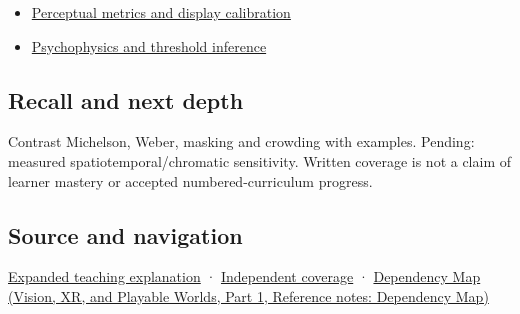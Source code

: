\begin{itemize}
\tightlist
\item
  \hyperref[appendix-b2c1846508bf]{Perceptual metrics and display calibration}
\item
  \hyperref[appendix-1759f03e8ce7]{Psychophysics and threshold inference}
\end{itemize}

\subsection{Recall and next depth}\label{appendix-b3aa9e8e01ad-recall-and-next-depth}

\hypertarget{appendix-b3aa9e8e01ad-recall-and-next-depth}{}

Contrast Michelson, Weber, masking and crowding with examples. Pending: measured spatiotemporal/chromatic sensitivity. Written coverage is not a claim of learner mastery or accepted numbered-curriculum progress.

\subsection{Source and navigation}\label{appendix-b3aa9e8e01ad-source-and-navigation}

\hypertarget{appendix-b3aa9e8e01ad-source-and-navigation}{}

\hyperref[04-visual-computing-ii-ch042-visibility-is-about-contrast-conditions-and-tasks]{Expanded teaching explanation} · \hyperref[appendix-fd090d982a15-xr01---independent-seeing-and-representation-source]{Independent coverage} · \href{../07-Vision-XR-and-Playable-Worlds-P01/main.pdf\#nameddest=appendix-4ad47bdd269a}{Dependency Map (Vision, XR, and Playable Worlds, Part 1, Reference notes: Dependency Map)}
